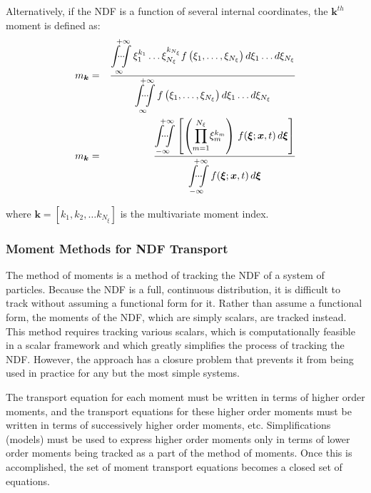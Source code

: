 Alternatively, if the NDF is a function of several internal coordinates, the $\boldsymbol{k}^{th}$ moment is defined as:
\begin{eqnarray}\label{eq:multivariate moment definition}
m_{\boldsymbol{k}} & = & \dfrac{ \displaystyle{ \dotsintop_{\infty}^{+\infty}{ \xi_{1}^{k_1} \dots \xi_{N_{\xi}}^{k_{N_{\xi}}}   f \left( \xi_1, \dots, \xi_{N_{\xi}} \right)   d\xi_1 \dots d\xi_{N_{\xi}} } }}
{  \displaystyle{ \dotsintop_{\infty}^{+\infty}{ f \left( \xi_1, \dots, \xi_{N_{\xi}} \right)   d\xi_1 \dots d\xi_{N_{\xi}} } } }
\\
m_{\boldsymbol{k}} & = & \dfrac{{\displaystyle \dotsintop_{-\infty}^{+\infty}}\left[
\left({\displaystyle \prod_{m=1}^{N_{\xi}}}\xi_{m}^{k_{m}}\right)
\, f(\boldsymbol{\xi};\boldsymbol{x},t)\, d\boldsymbol{\xi}\right]}{{\displaystyle \dotsintop_{-\infty}^{+\infty}}\, f(\boldsymbol{\xi};\boldsymbol{x},t)\, d\boldsymbol{\xi}}
\end{eqnarray}

\noindent where $\boldsymbol{k} = \left[ k_1, k_2, \dots k_{N_{\xi}} \right] $ is the multivariate moment index.



\subsubsection{Moment Methods for NDF Transport}\label{subsubsec:momentmethods}

The method of moments is a method of tracking the NDF of a system of particles. Because the NDF is a full, continuous distribution, it is difficult to track without assuming a functional form for it. Rather than assume a functional form, the moments of the NDF, which are simply scalars, are tracked instead. This method requires tracking various scalars, which is computationally feasible in a scalar framework and which greatly simplifies the process of tracking the NDF. However, the approach has a closure problem that prevents it from being used in practice for any but the most simple systems.

The transport equation for each moment must be written in terms of higher order moments, and the transport equations for these higher order moments must be written in terms of successively higher order moments, etc. Simplifications (models) must be used to express higher order moments only in terms of lower order moments being tracked as a part of the method of moments. Once this is accomplished, the set of moment transport equations becomes a closed set of equations.



